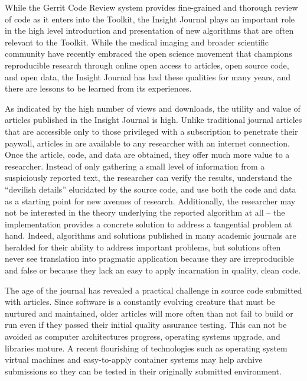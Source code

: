 \documentclass{frontiersENG} %
\begin{document}
While the Gerrit Code Review system provides fine-grained and thorough review
of code as it enters into the Toolkit, the Insight Journal plays an important
role in the high level introduction and presentation of new algorithms that
are often relevant to the Toolkit. While the medical imaging and broader
scientific community have recently embraced the open science movement that
champions reproducible research through online open access to articles, open
source code, and open data, the Insight Journal has had these qualities for
many years, and there are lessons to be learned from its experiences.

As indicated by the high number of views and downloads, the utility and value of
articles published in the Insight Journal is high.  Unlike traditional
journal articles that are accessible only to those privileged with a
subscription to penetrate their paywall, articles in are available to any
researcher with an internet connection. Once the article, code, and data are
obtained, they offer much more value to a researcher. Instead of only gathering a
small level of information from a suspiciously reported text, the researcher
can verify the results, understand the ``devilish details'' elucidated by the
source code, and use both the code and data as a starting point for new
avenues of research. Additionally, the researcher may not be interested in the
theory underlying the reported algorithm at all -- the implementation provides
a concrete solution to address a tangential problem at hand. Indeed,
algorithms and solutions published in many academic journals are heralded for
their ability to address important problems, but solutions often never see
translation into pragmatic application because they are irreproducible and
false or because they lack an easy to apply incarnation in quality, clean
code.

The age of the journal has revealed a practical challenge in source code
submitted with articles. Since software is a constantly evolving creature that
must be nurtured and maintained, older articles will more often than not fail
to build or run even if they passed their initial quality assurance testing.
This can not be avoided as computer architectures progress, operating systems
upgrade, and libraries mature. A recent flourishing of technologies such as
operating system virtual machines and easy-to-apply container systems may help
archive submissions so they can be tested in their originally submitted
environment.
\end{document}
